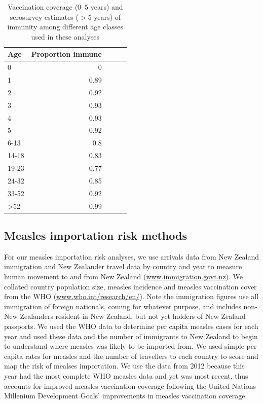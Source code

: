 \documentclass{article}
\begin{document}
\begin{itemize}
\begin{table}[htdp]
\begin{center}
\begin{tabular}{lrrrr}
\hline
Age &  Proportion immune\\
\hline
0  & 0\\
1  & 0.89\\
2	& 0.92\\
3	& 0.93\\
4	& 0.93\\
5	& 0.92\\
6-13	& 0.8\\
14-18	& 0.83\\
19-23	& 0.77\\
24-32	& 0.85\\
33-52	& 0.92\\
>52	& 0.99\\
\hline
\end{tabular}
\end{center}
\caption{Vaccination coverage (0--5 years) and serosurvey estimates ($>5$ years) of immunity among different age classes used in these analyses}
\label{table:sero}
\end{table}%

\subsection{Measles importation risk methods}

For our measles importation risk analyses, we use arrivals data from New Zealand immigration and New Zealander travel data by country and year to measure human movement to and from New Zealand  (\href{http://www.immigration.govt.nz/}{www.immigration.govt.nz}). We collated country population size, measles incidence and measles vaccination cover from the WHO (\href{http://www.who.int/research/en/}{www.who.int/research/en/}). Note the immigration figures use all immigration of foreign nationals, coming for whatever purpose, and includes non-New Zealanders resident in New Zealand, but not yet holders of New Zealand passports. We used the WHO data to determine per capita measles cases for each year and used these data and the number of immigrants to New Zealand to begin to understand where measles was likely to be imported from. We used simple per capita rates for measles and the number of travellers to each country to score and map the risk of mealses importation. We use the data from 2012 because this year had the most complete WHO measles data and yet was most recent, thus accounts for improved measles vaccination coverage following the United Nations Millenium Development Goals' improvements in measles vaccination coverage. 



\end{itemize}
\end{document}
